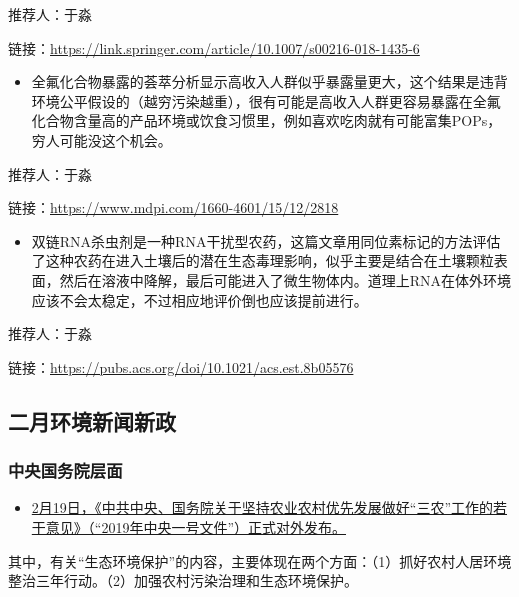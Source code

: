 \documentclass[
]{book}
\providecommand{\tightlist}{%
  \setlength{\itemsep}{0pt}\setlength{\parskip}{0pt}}
\begin{document}
推荐人：于淼

链接：\url{https://link.springer.com/article/10.1007/s00216-018-1435-6}

\begin{itemize}
\tightlist
\item
  全氟化合物暴露的荟萃分析显示高收入人群似乎暴露量更大，这个结果是违背环境公平假设的（越穷污染越重），很有可能是高收入人群更容易暴露在全氟化合物含量高的产品环境或饮食习惯里，例如喜欢吃肉就有可能富集POPs，穷人可能没这个机会。
\end{itemize}

推荐人：于淼

链接：\url{https://www.mdpi.com/1660-4601/15/12/2818}

\begin{itemize}
\tightlist
\item
  双链RNA杀虫剂是一种RNA干扰型农药，这篇文章用同位素标记的方法评估了这种农药在进入土壤后的潜在生态毒理影响，似乎主要是结合在土壤颗粒表面，然后在溶液中降解，最后可能进入了微生物体内。道理上RNA在体外环境应该不会太稳定，不过相应地评价倒也应该提前进行。
\end{itemize}

推荐人：于淼

链接：\url{https://pubs.acs.org/doi/10.1021/acs.est.8b05576}

\hypertarget{ux4e8cux6708ux73afux5883ux65b0ux95fbux65b0ux653f}{%
\subsection*{二月环境新闻新政}\label{ux4e8cux6708ux73afux5883ux65b0ux95fbux65b0ux653f}}

\hypertarget{ux4e2dux592eux56fdux52a1ux9662ux5c42ux9762}{%
\subsubsection*{中央国务院层面}\label{ux4e2dux592eux56fdux52a1ux9662ux5c42ux9762}}

\begin{itemize}
\tightlist
\item
  \href{http://www.moa.gov.cn/xw/zwdt/201902/t20190219_6172153.htm}{2月19日，《中共中央、国务院关于坚持农业农村优先发展做好``三农''工作的若干意见》（``2019年中央一号文件''）正式对外发布。}
\end{itemize}

其中，有关``生态环境保护''的内容，主要体现在两个方面：（1）抓好农村人居环境整治三年行动。（2）加强农村污染治理和生态环境保护。
\end{document}
